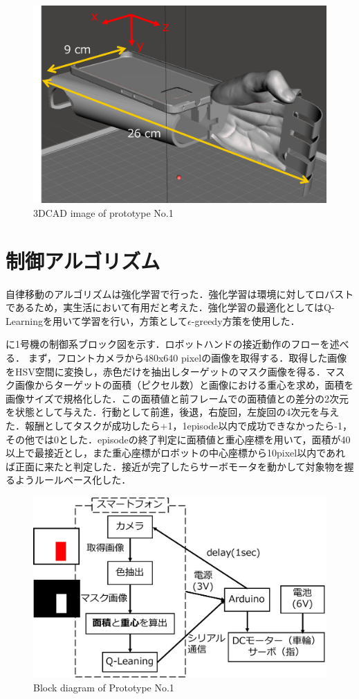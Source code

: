 \begin{figure}[H]
    \centering
    \includegraphics[width=\linewidth]{figure/chapter3/1号機CAD}
    \caption{3DCAD image of prototype No.1}
    \label{fig:1号機CAD}
\end{figure}


\section{制御アルゴリズム}
自律移動のアルゴリズムは強化学習で行った．強化学習は環境に対してロバストであるため，実生活において有用だと考えた．強化学習の最適化としてはQ-Learningを用いて学習を行い，方策として$\epsilon$-greedy方策を使用した．

に1号機の制御系ブロック図を示す．ロボットハンドの接近動作のフローを述べる．
まず，フロントカメラから480x640 pixelの画像を取得する．取得した画像をHSV空間に変換し，赤色だけを抽出しターゲットのマスク画像を得る．マスク画像からターゲットの面積（ピクセル数）と画像における重心を求め，面積を画像サイズで規格化した．この面積値と前フレームでの面積値との差分の2次元を状態として与えた．行動として前進，後退，右旋回，左旋回の4次元を与えた．報酬としてタスクが成功したら+1，1episode以内で成功できなかったら-1，その他では0とした．episodeの終了判定に面積値と重心座標を用いて，面積が40以上で最接近とし，また重心座標がロボットの中心座標から10pixel以内であれば正面に来たと判定した．接近が完了したらサーボモータを動かして対象物を握るようルールベース化した．

\begin{figure}[H]
    \centering
    \includegraphics[width=0.7\linewidth]{figure/chapter3/1号機制御図-2}
    \caption{Block diagram of Prototype No.1}
    \label{fig:1号機制御図}
\end{figure}



